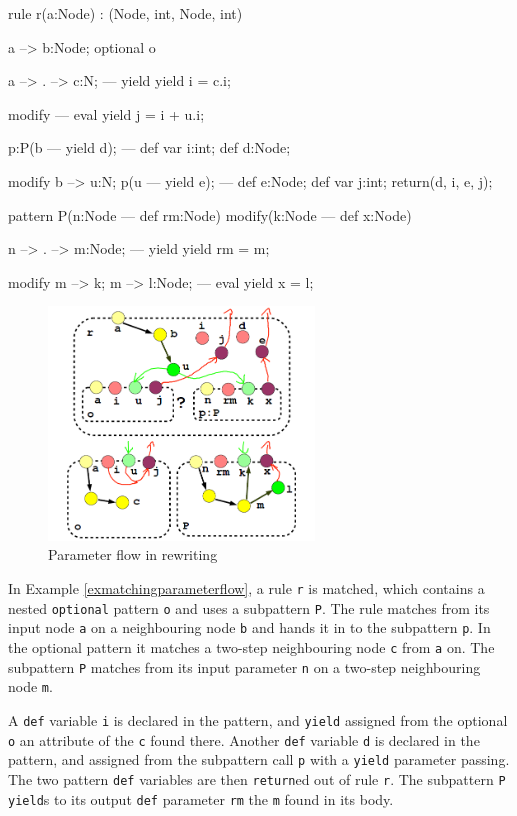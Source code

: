\begin{example}
  \begin{grgen}
rule r(a:Node) : (Node, int, Node, int) {
  a --> b:Node;
  optional o {
    a --> . --> c:N;
  ---
    yield {	yield i = c.i; }

    modify {
    ---
      eval { yield j = i + u.i; }
    }
  }
  p:P(b --- yield d);
---	
  def var i:int;
  def d:Node;

  modify {
    b --> u:N;
    p(u --- yield e);
  ---
    def e:Node; def var j:int;
    return(d, i, e, j);
  }
}
pattern P(n:Node --- def rm:Node) modify(k:Node --- def x:Node) {
  n --> . --> m:Node;
---
  yield {	yield rm = m; }

  modify {
    m --> k; m --> l:Node;
  ---
    eval { yield x = l; }
  }
}
  \end{grgen}
\end{example}\label{exrewritingparameterflow}

\begin{figure}[hptb]
  \centering
  \includegraphics[width=0.63\textwidth]{fig/RewriteAndParameterFlowAnnotated}
  \caption{Parameter flow in rewriting}
  \label{figrewritingparameterflow}
\end{figure}

In Example \ref{exmatchingparameterflow}, a rule \texttt{r} is matched, which contains a nested \texttt{optional} pattern \texttt{o} and uses a subpattern \texttt{P}.
The rule matches from its input node \texttt{a} on a neighbouring node \texttt{b} and hands it in to the subpattern \texttt{p}.
In the optional pattern it matches a two-step neighbouring node \texttt{c} from \texttt{a} on.
The subpattern \texttt{P} matches from its input parameter \texttt{n} on a two-step neighbouring node \texttt{m}.

A \texttt{def} variable \texttt{i} is declared in the pattern, and \texttt{yield} assigned from the optional \texttt{o} an attribute of the \texttt{c} found there.
Another \texttt{def} variable \texttt{d} is declared in the pattern, and assigned from the subpattern call \texttt{p} with a \texttt{yield} parameter passing. 
The two pattern \texttt{def} variables are then \texttt{return}ed out of rule \texttt{r}.
The subpattern \texttt{P} \texttt{yield}s to its output \texttt{def} parameter \texttt{rm} the \texttt{m} found in its body.

